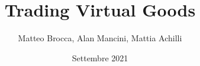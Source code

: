 \documentclass[12pt,a4paper]{article}
\title{Trading Virtual Goods}
\author{Matteo Brocca, Alan Mancini, Mattia Achilli}
\date{Settembre 2021}\let\Date
\begin{document}
\begin{titlepage}
\begin{center}
	{{\Large{\textsc{Alma Mater Studiorum $\cdot$ Universit\`a di Bologna}}}} \rule[0.1cm]{15.8cm}{0.1mm}
	\rule[0.5cm]{15.8cm}{0.6mm}
	{\small{\bf Corso di\\Applciazioni e Servizi Web\\Docenti: Silvia Mirri, Roberto Girau}}
\end{center}
\vspace{15mm}
\begin{center}
	{\Huge{\bf TRADING}}\\
	\vspace{4mm}
	{\Huge{\bf VIRTUAL}}\\
	\vspace{4mm}
	{\Huge{\bf GOODS}}\\
\end{center}
\vspace{40mm}
\par
\noindent
\begin{center}
{\large{
	\textit{Autori}:\\  
	Matteo Brocca $\cdot$ 1005681\\
	Alan Mancini $\cdot$ 1005481\\
	Mattia Achilli $\cdot$ 979641
}}
\end{center}
\vspace{40mm}
\begin{center}
	\large{Settembre 2021}
\end{center}
\end{titlepage}

\newpage

\tableofcontents
\newpage












\end{document}

